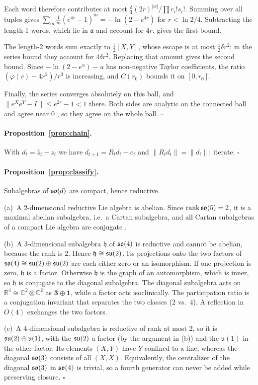 Each word therefore contributes at most $\frac{\delta}{4}(2r)^{|w|}/\prod r_i!s_i!$. Summing over all tuples
gives $\sum_m\frac1m(e^{4r}-1)^m=-\ln(2-e^{4r})$ for $r<\ln2/4$. Subtracting the length-1 words, which lie in
$\mathfrak a$ and account for $4r$, gives the first bound.

The length-2 words sum exactly to $\frac12[X,Y]$, whose escape is at most $\frac12\delta r^2$; in the series
bound they account for $4\delta r^2$. Replacing that amount gives the second bound. Since $-\ln(2-e^u)-u$ has
non-negative Taylor coefficients, the ratio $(\varphi(r)-4r^2)/r^3$ is increasing, and $C(r_0)$ bounds it on
$[0,r_0]$.

Finally, the series converges absolutely on this ball, and $\|e^Xe^Y-I\|\le e^{2r}-1<1$ there. Both sides are
analytic on the connected ball and agree near $0$ \citep[Thm.~5.3]{hall2015lie}, so they agree on the whole
ball. $\square$

\paragraph{Proposition~\ref{prop:chain}.}
With $d_t=\hat z_t-z_t$ we have $d_{t+1}=R_td_t-e_t$ and $\|R_td_t\|=\|d_t\|$; iterate. $\square$

\paragraph{Proposition~\ref{prop:classify}.}
Subalgebras of $\mathfrak{so}(d)$ are compact, hence reductive.

(a)~A 2-dimensional reductive Lie algebra is abelian. Since $\operatorname{rank}\mathfrak{so}(5)=2$, it is a maximal
abelian subalgebra, i.e.\ a Cartan subalgebra, and all Cartan subalgebras of a compact Lie algebra are
conjugate \citep{adams1969lectures}.

(b)~A 3-dimensional subalgebra $\mathfrak h$ of $\mathfrak{so}(4)$ is reductive and cannot be abelian, because the rank
is 2. Hence $\mathfrak h\cong\mathfrak{su}(2)$. Its projections onto the two factors of
$\mathfrak{so}(4)\cong\mathfrak{su}(2)\oplus\mathfrak{su}(2)$ are each either zero or an isomorphism. If one projection is zero,
$\mathfrak h$ is a factor. Otherwise $\mathfrak h$ is the graph of an automorphism, which is inner, so
$\mathfrak h$ is conjugate to the diagonal subalgebra. The diagonal subalgebra acts on
$\mathbb R^4\cong\mathbb C^2\otimes\mathbb C^2$ as $\mathbf 3\oplus\mathbf 1$, while a factor acts
isoclinically. The participation ratio is a conjugation invariant that separates the two classes ($2$ vs.\
$4$). A reflection in $O(4)$ exchanges the two factors.

(c)~A 4-dimensional subalgebra is reductive of rank at most 2, so it is $\mathfrak{su}(2)\oplus\mathfrak u(1)$, with the
$\mathfrak{su}(2)$ a factor (by the argument in (b)) and the $\mathfrak u(1)$ in the other factor. Its elements $(X,Y)$
have $Y$ confined to a line, whereas the diagonal $\mathfrak{so}(3)$ consists of all $(X,X)$. Equivalently, the
centralizer of the diagonal $\mathfrak{so}(3)$ in $\mathfrak{so}(4)$ is trivial, so a fourth generator can never be added while
preserving closure. $\square$
